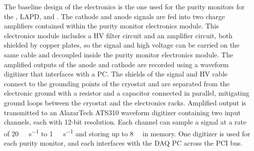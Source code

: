 The baseline design of the  electronics is the one used for the purity monitors for the , LAPD, and \microboone. The cathode and anode signals are fed into two charge amplifiers contained within the purity monitor electronics module.
This electronics module includes a HV filter circuit and an amplifier circuit, both shielded by copper plates, so the signal and high voltage can be carried on the same cable and decoupled inside the purity monitor electronics module.
The amplified outputs of the anode and cathode are recorded using a waveform digitizer that interfaces with a  PC.
The shields of the signal and HV cable connect to the grounding points of the cryostat and are separated from the electronic ground with a resistor and a capacitor connected in parallel, mitigating ground loops between the cryostat and the electronics racks. Amplified output is transmitted to an AlazarTech ATS310 waveform digitizer containing two input channels, each with 12-bit resolution. Each channel can sample a signal at a rate of \SI{20}{\mega\samples\per\second} to \SI{1}{\kilo\samples\per\second} and storing up to \SI{8}{\mega\samples} in memory. One digitizer is used for each purity monitor, and each  interfaces with the DAQ PC across the PCI bus. 

